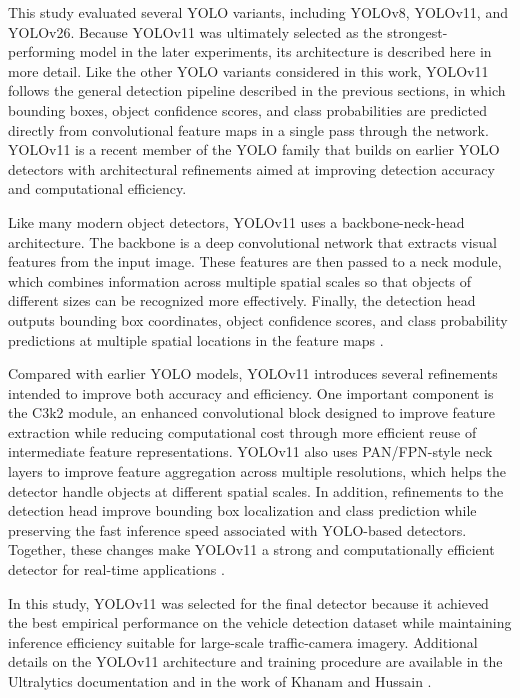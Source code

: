 This study evaluated several YOLO variants, including YOLOv8, YOLOv11, and YOLOv26.
Because YOLOv11 was ultimately selected as the strongest-performing model in the later
experiments, its architecture is described here in more detail. Like the other YOLO
variants considered in this work, YOLOv11 follows the general detection pipeline
described in the previous sections, in which bounding boxes, object confidence scores,
and class probabilities are predicted directly from convolutional feature maps in a
single pass through the network. YOLOv11 is a recent member of the YOLO family that
builds on earlier YOLO detectors with architectural refinements aimed at improving
detection accuracy and computational efficiency.

Like many modern object detectors, YOLOv11 uses a backbone-neck-head architecture.
The backbone is a deep convolutional network that extracts visual features from the
input image. These features are then passed to a neck module, which combines
information across multiple spatial scales so that objects of different sizes can be
recognized more effectively. Finally, the detection head outputs bounding box
coordinates, object confidence scores, and class probability predictions at multiple
spatial locations in the feature maps \cite{YOLOv11paper}.

Compared with earlier YOLO models, YOLOv11 introduces several refinements intended to
improve both accuracy and efficiency. One important component is the C3k2 module, an
enhanced convolutional block designed to improve feature extraction while reducing
computational cost through more efficient reuse of intermediate feature
representations. YOLOv11 also uses PAN/FPN-style neck layers to improve feature
aggregation across multiple resolutions, which helps the detector handle objects at
different spatial scales. In addition, refinements to the detection head improve
bounding box localization and class prediction while preserving the fast inference
speed associated with YOLO-based detectors. Together, these changes make YOLOv11 a
strong and computationally efficient detector for real-time applications
\cite{YOLOv11paper}.

In this study, YOLOv11 was selected for the final detector because it achieved the
best empirical performance on the vehicle detection dataset while maintaining
inference efficiency suitable for large-scale traffic-camera imagery. Additional
details on the YOLOv11 architecture and training procedure are available in the
Ultralytics documentation \cite{yolo11_ultralytics} and in the work of Khanam and
Hussain \cite{YOLOv11paper}.

